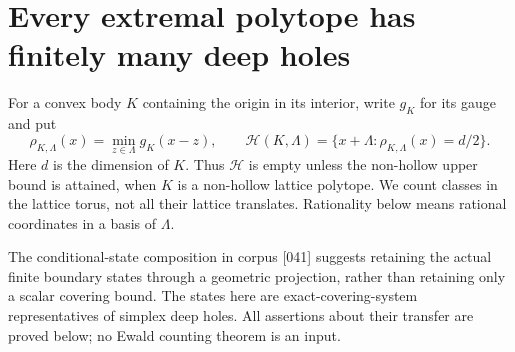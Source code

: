 \documentclass[11pt,a4paper]{article}
\theoremstyle{remark}\newtheorem{remark}[theorem]{Remark}
\begin{document}
\section{Every extremal polytope has finitely many deep holes}
\label{ce:section}

For a convex body $K$ containing the origin in its interior, write
$g_K$ for its gauge and put
\[
 \rho_{K,\Lambda}(x)=\min_{z\in\Lambda}g_K(x-z),\qquad
 \mathcal H(K,\Lambda)=
 \{x+\Lambda:\rho_{K,\Lambda}(x)=d/2\}.
\]
Here $d$ is the dimension of $K$. Thus $\mathcal H$ is empty unless
the non-hollow upper bound is attained, when $K$ is a non-hollow
lattice polytope. We count classes in the lattice torus, not all
their lattice translates.
Rationality below means rational coordinates in a basis of $\Lambda$.

The conditional-state composition in corpus [041] suggests retaining
the actual finite boundary states through a geometric projection,
rather than retaining only a scalar covering bound. The states here
are exact-covering-system representatives of simplex deep holes.
All assertions about their transfer are proved below; no Ewald
counting theorem is an input.
\end{document}
